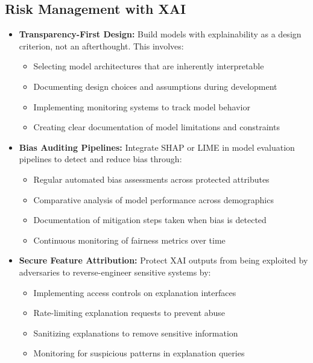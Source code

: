 \documentclass[12pt]{article}
\begin{document}
\subsection{Risk Management with XAI}
\begin{itemize}[noitemsep]
  \item \textbf{Transparency-First Design:} Build models with explainability as a design criterion, not an afterthought. This involves:
    \begin{itemize}
      \item Selecting model architectures that are inherently interpretable
      \item Documenting design choices and assumptions during development
      \item Implementing monitoring systems to track model behavior
      \item Creating clear documentation of model limitations and constraints
    \end{itemize}
    
  \item \textbf{Bias Auditing Pipelines:} Integrate SHAP or LIME in model evaluation pipelines to detect and reduce bias through:
    \begin{itemize}
      \item Regular automated bias assessments across protected attributes
      \item Comparative analysis of model performance across demographics
      \item Documentation of mitigation steps taken when bias is detected
      \item Continuous monitoring of fairness metrics over time
    \end{itemize}
    
  \item \textbf{Secure Feature Attribution:} Protect XAI outputs from being exploited by adversaries to reverse-engineer sensitive systems by:
    \begin{itemize}
      \item Implementing access controls on explanation interfaces
      \item Rate-limiting explanation requests to prevent abuse
      \item Sanitizing explanations to remove sensitive information
      \item Monitoring for suspicious patterns in explanation queries
    \end{itemize}
\end{itemize}
\end{document}
